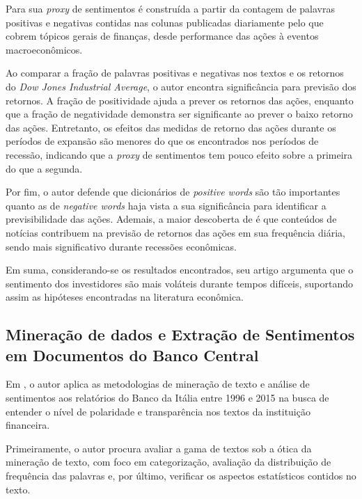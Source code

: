 Para sua \textit{proxy} de sentimentos é construída a partir da contagem de palavras positivas e negativas contidas nas colunas publicadas diariamente pelo  que cobrem tópicos gerais de finanças, desde performance das ações à eventos macroeconômicos.

Ao comparar a fração de palavras positivas e negativas nos textos e os retornos do \textit{Dow Jones Industrial Average}, o autor encontra significância para previsão dos retornos. A fração de positividade ajuda a prever os retornos das ações, enquanto que a fração de negatividade demonstra ser significante ao prever o baixo retorno das ações. Entretanto, os efeitos das medidas de retorno das ações durante os períodos de expansão são menores do que os encontrados nos períodos de recessão, indicando que a \textit{proxy} de sentimentos tem pouco efeito sobre a primeira do que a segunda.

Por fim, o autor defende que dicionários de \textit{positive words} são tão importantes quanto as de \textit{negative words} haja vista a sua significância para identificar a previsibilidade das ações. Ademais, a maior descoberta de  é que conteúdos de notícias contribuem na previsão de retornos das ações em sua frequência diária, sendo mais significativo durante recessões econômicas.

Em suma, considerando-se os resultados encontrados, seu artigo argumenta que o sentimento dos investidores são mais voláteis durante tempos difíceis, suportando assim as hipóteses encontradas na literatura econômica.

\subsection{Mineração de dados e Extração de Sentimentos em Documentos do Banco Central}

Em , o autor aplica as metodologias de mineração de texto e análise de sentimentos aos relatórios do Banco da Itália entre 1996 e 2015 na busca de entender o nível de polaridade e transparência nos textos da instituição financeira.

Primeiramente, o autor procura avaliar a gama de textos sob a ótica da mineração de texto, com foco em categorização, avaliação da distribuição de frequência das palavras e, por último, verificar os aspectos estatísticos contidos no texto. 


